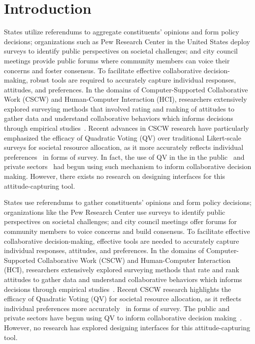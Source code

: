 \section{Introduction}
States utilize referendums to aggregate constituents' opinions and form policy decisions; organizations such as Pew Research Center in the United States deploy surveys to identify public perspectives on societal challenges; and city council meetings provide public forums where community members can voice their concerns and foster consensus. To facilitate effective collaborative decision-making, robust tools are required to accurately capture individual responses, attitudes, and preferences. In the domains of Computer-Supported Collaborative Work (CSCW) and Human-Computer Interaction (HCI), researchers extensively explored surveying methods that involved rating and ranking of attitudes to gather data and understand collaborative behaviors which informs decisions through empirical studies~\cite{}. Recent advances in CSCW research have particularly emphasized the efficacy of Quadratic Voting (QV) over traditional Likert-scale surveys for societal resource allocation, as it more accurately reflects individual preferences~\cite{chengCanShowWhat2021} in forms of survey. In fact, the use of QV in the in the public~\cite{rogersColoradoTriedNew2019, teamTaiwanDigitalMinister} and private sectors~\cite{Gov4gitDecentralizedPlatform2023} had begun using such mechanism to inform collaborative decision making. However, there exists no research on designing interfaces for this attitude-capturing tool. 

States use referendums to gather constituents' opinions and form policy decisions; organizations like the Pew Research Center use surveys to identify public perspectives on societal challenges; and city council meetings offer forums for community members to voice concerns and build consensus. To facilitate effective collaborative decision-making, effective tools are needed to accurately capture individual responses, attitudes, and preferences. In the domains of Computer-Supported Collaborative Work (CSCW) and Human-Computer Interaction (HCI), researchers extensively explored surveying methods that rate and rank attitudes to gather data and understand collaborative behaviors which informs decisions through empirical studies~\cite{}. Recent CSCW research highlights the efficacy of Quadratic Voting (QV) for societal resource allocation, as it reflects individual preferences more accurately~\cite{chengCanShowWhat2021} in forms of survey. The public and private sectors have begun using QV to inform collaborative decision making~\cite{rogersColoradoTriedNew2019, teamTaiwanDigitalMinister, Gov4gitDecentralizedPlatform2023}. However, no research has explored designing interfaces for this attitude-capturing tool.

